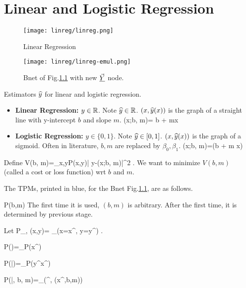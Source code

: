 \chapter{Linear and Logistic Regression}

\begin{figure}[h!]
\centering
\texttt{[image: linreg/linreg.png]}
\caption{Linear Regression}
\label{fig-linreg}
\end{figure}

\begin{figure}[h!]
\centering
\texttt{[image: linreg/linreg-emul.png]}
\caption{Bnet of Fig.\ref{fig-linreg}  with new $\vec{\underline{Y}}$ node.}\label{fig-linreg-emul}
\end{figure}



Estimators ${\widehat{y}}$ for linear and logistic regression.
\begin{itemize}
\item

\textbf{Linear Regression:} $y\in { \mathbb{R}}$.
Note ${\widehat{y}}\in { \mathbb{R}}$. $(x,{\widehat{y}}(x))$ is
the graph
of a straight line
with y-intercept $b$ and slope $m$.
\beq
\haty(x;b, m)= b + mx
\eeq

\item
\textbf{Logistic Regression:} $y\in\{0, 1\}$. Note ${\widehat{y}}\in [0,1]$. $
(x,{\widehat{y}}(x))$ is the graph
of a sigmoid.
 Often in literature, $b,m$ are replaced by $\beta_0, \beta_1$.
\beq
\haty(x;b, m)=\smoid(b + m x)
\eeq
\end{itemize}

Define
\beq
V(b, m)=\sum_{x,y}P(x,y)| y-\haty(x;b, m)|^2
\;.\label{eq-norm-cost}
\eeq
We want to minimize $V(b,m)$ (called a cost or loss function) wrt $b$ and $m$.


The TPMs, printed in blue, for the
Bnet Fig.\ref{fig-linreg}, are as follows.

\beq\color{blue}
P(b,m) 
\eeq
The first time it is used,
$(b,m)$ is arbitrary.
After the first time, it is determined
by previous stage.

Let
\beq
P_{\rvx, \rvy}(x,y)=
\sum_\s \indi(x=x^\s, y=y^\s)
\;.
\eeq

\beq\color{blue}
P(\vecx)=\prod_\s P(x^\s)
\eeq

\beq\color{blue}
P(\vecy|\vecx)=\prod_\s P(y^\s\cond x^\s)
\eeq

\beq\color{blue}
P(\vec{\haty}|\vecx, b, m)=\prod_\s \delta(\haty^\s, \haty(x^\s,b,m))
\label{eq-replace1}
\eeq

